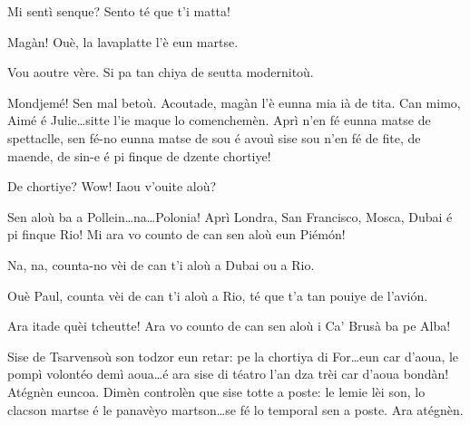 \begin{drama}
\Paganspeaks Mi sentì senque? Sento té que t'i matta!

\Nevaousaspeaks Magàn! Ouè, la lavaplatte l'è eun martse.

\Maganspeaks Vou aoutre vère. Si pa tan chiya de seutta modernitoù.


\Paganspeaks Mondjemé! Sen mal betoù.  Acoutade, magàn l'è eunna mia ià de tita. Can mimo, Aimé é Julie\ldots sitte l'ie maque lo comenchemèn. Aprì n'en fé eunna matse de spettaclle, sen fé-no eunna matse de sou é avouì sise sou n'en fé de fite, de maende, de sin-e é pi finque de dzente chortiye!

\Nevaousaspeaks De chortiye? Wow! Iaou v'ouite aloù?

\Paganspeaks Sen aloù ba a Pollein\ldots na\ldots Polonia! Aprì Londra, San Francisco,  Mosca, Dubai é pi finque Rio! Mi ara vo counto de can sen aloù eun Piém\'on!

\Nevaouspeaks Na, na, counta-no vèi de can t'i aloù a Dubai ou a Rio.

 
\Maganspeaks Ouè Paul, counta vèi de can t'i aloù a Rio, té que t'a tan pouiye de l’avi\'on.

\Paganspeaks{} Ara itade quèi tcheutte! Ara vo counto de can sen aloù i Ca' Brusà ba pe Alba! 






\Chauffeurspeaks Sise de Tsarvensoù son todzor eun retar: pe la chortiya di For\ldots eun car d'aoua, le pompì volontéo demì aoua\ldots é ara sise di téatro l'an dza trèi car d'aoua bondàn! Atégnèn euncoa. Dimèn controlèn que sise totte a poste: le lemie lèi son, lo clacson martse é le panavèyo martson\ldots se fé lo temporal sen a poste. Ara atégnèn.



\end{drama}
